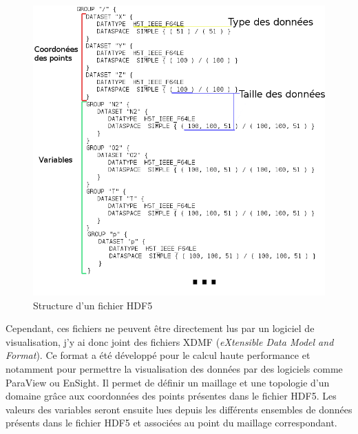 \begin{figure}[!ht]
  \centering
  \includegraphics[scale=0.5]{figures/hdf5_struct.png}
  \caption{\label{fig:hdf5_struct} Structure d'un fichier HDF5}
\end{figure}

Cependant, ces fichiers ne peuvent être directement lus par un logiciel de visualisation, j'y ai donc joint des fichiers XDMF (\textit{eXtensible Data Model and Format}). Ce format a été développé pour le calcul haute performance et notamment pour permettre la visualisation des données par des logiciels comme ParaView ou EnSight. Il permet de définir un maillage et une topologie d'un domaine grâce aux coordonnées des points présentes dans le fichier HDF5. Les valeurs des variables seront ensuite lues depuis les différents ensembles de données présents dans le fichier HDF5 et associées au point du maillage correspondant.




